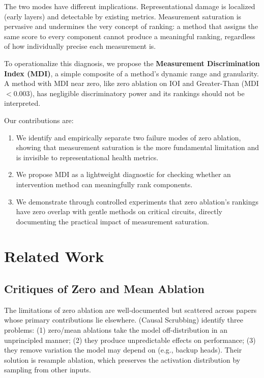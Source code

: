 \documentclass[pdflatex,sn-mathphys-num]{sn-jnl}
\begin{document}
The two modes have different implications. Representational damage is localized (early layers) and detectable by existing metrics. Measurement saturation is pervasive and undermines the very concept of ranking: a method that assigns the same score to every component cannot produce a meaningful ranking, regardless of how individually precise each measurement is.

To operationalize this diagnosis, we propose the \textbf{Measurement Discrimination Index (MDI)}, a simple composite of a method's dynamic range and granularity. A method with MDI near zero, like zero ablation on IOI and Greater-Than (MDI $< 0.003$), has negligible discriminatory power and its rankings should not be interpreted.

Our contributions are:
\begin{enumerate}
    \item We identify and empirically separate two failure modes of zero ablation, showing that measurement saturation is the more fundamental limitation and is invisible to representational health metrics.
    \item We propose MDI as a lightweight diagnostic for checking whether an intervention method can meaningfully rank components.
    \item We demonstrate through controlled experiments that zero ablation's rankings have zero overlap with gentle methods on critical circuits, directly documenting the practical impact of measurement saturation.
\end{enumerate}

\section{Related Work}

\subsection{Critiques of Zero and Mean Ablation}

The limitations of zero ablation are well-documented but scattered across papers whose primary contributions lie elsewhere. \citet{Chan2022} (Causal Scrubbing) identify three problems: (1) zero/mean ablations take the model off-distribution in an unprincipled manner; (2) they produce unpredictable effects on performance; (3) they remove variation the model may depend on (e.g., backup heads). Their solution is resample ablation, which preserves the activation distribution by sampling from other inputs.
\end{document}

